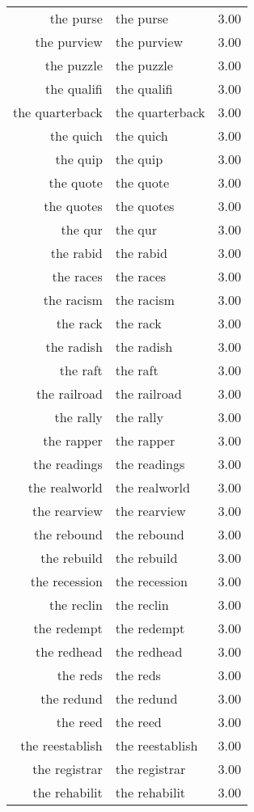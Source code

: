 \begin{table}[ht]
\begin{tabular}{rlr}
  the purse & the purse & 3.00 \\ 
  the purview & the purview & 3.00 \\ 
  the puzzle & the puzzle & 3.00 \\ 
  the qualifi & the qualifi & 3.00 \\ 
  the quarterback & the quarterback & 3.00 \\ 
  the quich & the quich & 3.00 \\ 
  the quip & the quip & 3.00 \\ 
  the quote & the quote & 3.00 \\ 
  the quotes & the quotes & 3.00 \\ 
  the qur & the qur & 3.00 \\ 
  the rabid & the rabid & 3.00 \\ 
  the races & the races & 3.00 \\ 
  the racism & the racism & 3.00 \\ 
  the rack & the rack & 3.00 \\ 
  the radish & the radish & 3.00 \\ 
  the raft & the raft & 3.00 \\ 
  the railroad & the railroad & 3.00 \\ 
  the rally & the rally & 3.00 \\ 
  the rapper & the rapper & 3.00 \\ 
  the readings & the readings & 3.00 \\ 
  the realworld & the realworld & 3.00 \\ 
  the rearview & the rearview & 3.00 \\ 
  the rebound & the rebound & 3.00 \\ 
  the rebuild & the rebuild & 3.00 \\ 
  the recession & the recession & 3.00 \\ 
  the reclin & the reclin & 3.00 \\ 
  the redempt & the redempt & 3.00 \\ 
  the redhead & the redhead & 3.00 \\ 
  the reds & the reds & 3.00 \\ 
  the redund & the redund & 3.00 \\ 
  the reed & the reed & 3.00 \\ 
  the reestablish & the reestablish & 3.00 \\ 
  the registrar & the registrar & 3.00 \\ 
  the rehabilit & the rehabilit & 3.00 \\ 

\end{tabular}
\end{table}
